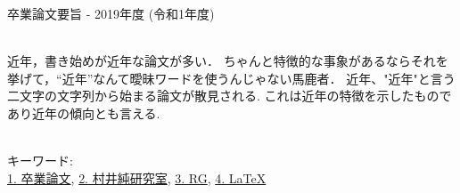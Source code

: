卒業論文要旨 - 2019年度 (令和1年度)
\begin{center}
\begin{large}
\end{large}
\end{center}

~ \\

近年，書き始めが近年な論文が多い．
ちゃんと特徴的な事象があるならそれを挙げて，``近年''なんて曖昧ワードを使うんじゃない馬鹿者．
近年、"近年"と言う二文字の文字列から始まる論文が散見される. これは近年の特徴を示したものであり近年の傾向とも言える.

~ \\
キーワード:\\
\underline{1. 卒業論文},
\underline{2. 村井純研究室},
\underline{3. RG},
\underline{4. LaTeX}
\begin{flushright}
\dept \\
\author
\end{flushright}
